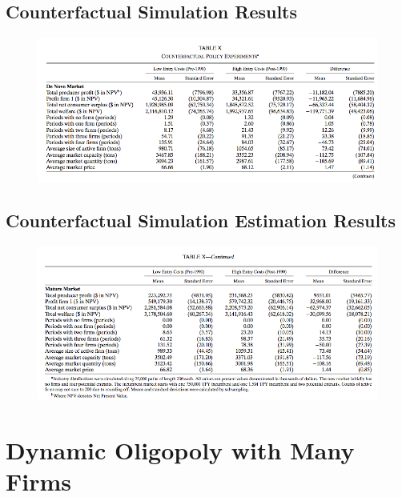 \documentclass[
]{book}
\begin{document}
\hypertarget{counterfactual-simulation-results}{%
\subsection{Counterfactual Simulation Results}\label{counterfactual-simulation-results}}

\begin{figure}

{\centering \includegraphics[width=0.8\linewidth]{figuretable/denovo} 

}

\end{figure}

\hypertarget{counterfactual-simulation-estimation-results}{%
\subsection{Counterfactual Simulation Estimation Results}\label{counterfactual-simulation-estimation-results}}

\begin{figure}

{\centering \includegraphics[width=0.8\linewidth]{figuretable/mature} 

}

\end{figure}

\hypertarget{dynamic-oligopoly-with-many-firms}{%
\section{Dynamic Oligopoly with Many Firms}\label{dynamic-oligopoly-with-many-firms}}
\end{document}
